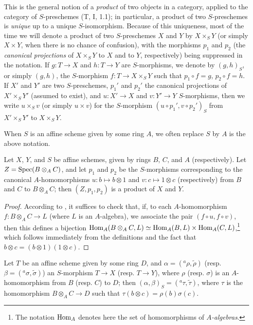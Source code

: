 This is the general notion of a \emph{product} of two objects in a category, applied
to the category of $S$-preschemes (T, I, 1.1); in particular, a product of two $S$-preschemes
is \emph{unique} up to a unique $S$-isomorphism. Because of this uniqueness, most of the time
we will denote a product of two $S$-preschemes $X$ and $Y$ by $X\times_S Y$ (or
simply $X\times Y$, when there is no chance of confusion), with the morphisms $p_1$ and $p_2$
(the \emph{canonical projections} of $X\times_S Y$ to $X$ and to $Y$, respectively) being suppressed
in the notation. If $g:T\to X$ and $h:T\to Y$ are $S$-morphisms, we denote by $(g,h)_S$, or
simply $(g,h)$, the $S$-morphism $f:T\to X\times_S Y$ such that $p_1\circ f=g$,
$p_2\circ f=h$. If $X'$ and $Y'$ are two $S$-preschemes, $p_1'$ and $p_2'$ the canonical
projections of $X'\times_S Y'$ (assumed to exist), and $u:X'\to X$ and $v:Y'\to Y$ $S$-morphisms, then we write $u\times_S v$ (or simply $u\times v$) for the $S$-morphism
$(u\circ p_1',v\circ p_2')_S$ from $X'\times_S Y'$ to $X\times_S Y$.

When $S$ is an affine scheme given by some ring $A$, we often replace $S$
by $A$ is the above notation.

\begin{proposition}[3.2.2]
\label{I.3.2.2}
Let $X$, $Y$, and $S$ be affine schemes, given by rings $B$, $C$, and $A$ (respectively). Let
$Z=\operatorname{Spec}(B\otimes_A C)$, and let $p_1$ and $p_2$ be the $S$-morphisms corresponding  to
the canonical $A$-homomorphisms $u:b\mapsto b\otimes 1$ and $v:c\mapsto 1\otimes c$ (respectively) from $B$
and $C$ to $B\otimes_A C$; then $(Z,p_1,p_2)$ is a product of $X$ and $Y$.
\end{proposition}

\begin{proof}
According to , it suffices to check that, if, to each $A$-homomorphism
$f:B\otimes_A C\to L$ (where $L$ is an $A$-algebra), we associate the pair
$(f\circ u,f\circ v)$, then this defines a bijection
$\operatorname{Hom}_A(B\otimes_A C,L)\simeq\operatorname{Hom}_A(B,L)\times\operatorname{Hom}_A(C,L)$,\footnote{The notation $\operatorname{Hom}_A$
denotes here the set of homomorphisms of \emph{$A$-algebras}.} which follows immediately
from the definitions and the fact that $b\otimes c=(b\otimes 1)(1\otimes c)$.
\end{proof}

\begin{corollary}[3.2.3]
\label{I.3.2.3}
Let $T$ be an affine scheme given by some ring $D$, and $\alpha=({}^a\rho,\widetilde{\rho})$
(resp. $\beta=({}^a\sigma,\widetilde{\sigma})$) an $S$-morphism $T\to X$ (resp. $T\to Y$),
where $\rho$ (resp. $\sigma$) is an $A$-homomorphism from $B$ (resp. $C$) to $D$; then
$(\alpha,\beta)_S=({}^a\tau,\widetilde{\tau})$, where $\tau$ is the homomorphism
$B\otimes_A C\to D$ such that $\tau(b\otimes c)=\rho(b)\sigma(c)$.
\end{corollary}

